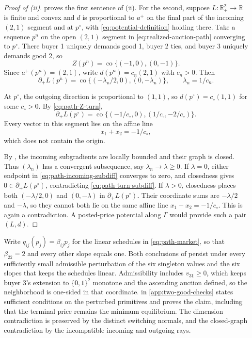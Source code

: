 \documentclass[11pt,a4paper,fleqn]{article}
\theoremstyle{plain}
\theoremstyle{definition}
\newcommand{\R}{\mathbb{R}}
\newcommand{\co}{\operatorname{co}}
\begin{document}
\begin{proof}[Proof of (ii)]
 proves the first sentence of (ii). For the second, suppose $L:\R_+^2\to\R$ is finite and convex and $d$ is proportional to $a^+$ on the final part of the incoming $(2,1)$ segment and at $p^\circ$, with \eqref{eq:potential-definition} holding there. Take a sequence $p^n$ on the open $(2,1)$ segment in \eqref{eq:realized-auction-path} converging to $p^\circ$. There buyer 1 uniquely demands good 1, buyer 2 ties, and buyer 3 uniquely demands good 2, so
\[
Z(p^n)=\co\{(-1,0),(0,-1)\}.
\]
Since $a^+(p^n)=(2,1)$, write $d(p^n)=c_n(2,1)$ with $c_n>0$. Then
\begin{equation}\label{eq:path-incoming-subdiff}
\partial_+L(p^n)
=\co\{(-\lambda_n/2,0),(0,-\lambda_n)\},
\qquad \lambda_n=1/c_n.
\end{equation}

At $p^\circ$, the outgoing direction is proportional to $(1,1)$, so $d(p^\circ)=c_\circ(1,1)$ for some $c_\circ>0$. By \eqref{eq:path-Z-turn},
\begin{equation}\label{eq:path-turn-subdiff}
\partial_+L(p^\circ)
=\co\{(-1/c_\circ,0),(1/c_\circ,-2/c_\circ)\}.
\end{equation}
Every vector in this segment lies on the affine line
\[
x_1+x_2=-1/c_\circ,
\]
which does not contain the origin.

By , the incoming subgradients are locally bounded and their graph is closed. Thus $(\lambda_n)$ has a convergent subsequence, say $\lambda_n\to\lambda\ge0$. If $\lambda=0$, either endpoint in \eqref{eq:path-incoming-subdiff} converges to zero, and closedness gives $0\in\partial_+L(p^\circ)$, contradicting \eqref{eq:path-turn-subdiff}. If $\lambda>0$, closedness places both $(-\lambda/2,0)$ and $(0,-\lambda)$ in $\partial_+L(p^\circ)$. Their coordinate sums are $-\lambda/2$ and $-\lambda$, so they cannot both lie on the same affine line $x_1+x_2=-1/c_\circ$. This is again a contradiction. A posted-price potential along $\Gamma$ would provide such a pair $(L,d)$.
\end{proof}

Write $q_{ij}(p_j)=\beta_{ij}p_j$ for the linear schedules in \eqref{eq:path-market}, so that $\beta_{22}=2$ and every other slope equals one. Both conclusions of  persist under every sufficiently small admissible perturbation of the six singleton values and the six slopes that keeps the schedules linear. Admissibility includes $v_{31}\ge0$, which keeps buyer 3's extension to $\{0,1\}^2$ monotone and the ascending auction defined, so the neighborhood is one-sided in that coordinate.  in \ref{app:two-good-checks} states sufficient conditions on the perturbed primitives and proves the claim, including that the terminal price remains the minimum equilibrium. The dimension contradiction is preserved by the distinct switching normals, and the closed-graph contradiction by the incompatible incoming and outgoing rays.
\end{document}
